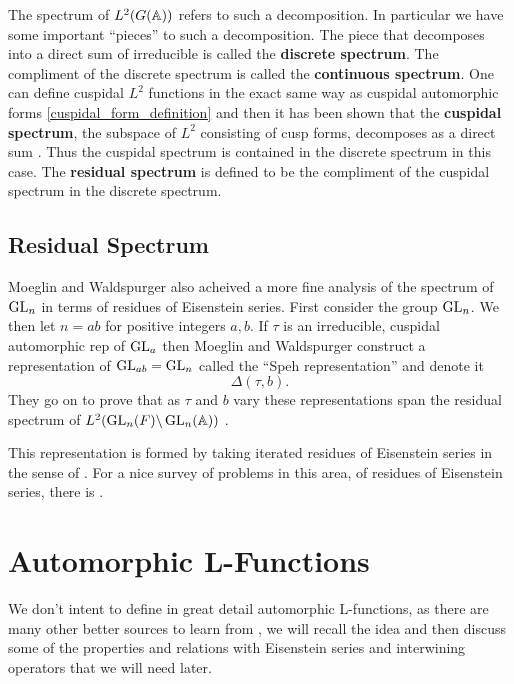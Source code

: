 The spectrum of \(L^2(G(\A))\) refers to such a decomposition. In particular we have some important ``pieces'' to such a decomposition. The piece that decomposes into a direct sum of irreducible is called the \textbf{discrete spectrum}. The compliment of the discrete spectrum is called the \textbf{continuous spectrum}. One can define cuspidal \(L^2\) functions in the exact same way as cuspidal automorphic forms \ref{cuspidal_form_definition} and then it has been shown that the \textbf{cuspidal spectrum}, the subspace of \(L^2\) consisting of cusp forms, decomposes as a direct sum \cite[9]{getzIntroductionAutomorphicRepresentations2024}. Thus the cuspidal spectrum is contained in the discrete spectrum in this case. The \textbf{residual spectrum} is defined to be the compliment of the cuspidal spectrum in the discrete spectrum.

\subsection{Residual Spectrum}\label{residual_spec}
Moeglin and Waldspurger also acheived a more fine analysis of the spectrum of \(\operatorname{GL}_n\) in terms of residues of Eisenstein series. 
First consider the group \(\operatorname{GL}_n\). We then let \(n = ab\) for positive integers \(a,b\). If \(\tau\) is an irreducible, cuspidal automorphic rep of \(\operatorname{GL}_a\) then Moeglin and Waldspurger construct a representation of \(\operatorname{GL}_{ab} = \operatorname{GL}_n\) called the ``Speh representation'' and denote it 
\[\Delta(\tau, b).\]
They go on to prove that as \(\tau\) and \(b\) vary these representations span the residual spectrum of \(L^2(\GL_n(F) \backslash \GL_n(\A))\) \cite[Thm. 1.1]{jiangPolesCertainResidual2013}.

This representation is formed by taking iterated residues of Eisenstein series in the sense of \cite[V]{moeglinSpectralDecompositionEisenstein1995}. For a nice survey of problems in this area, of residues of Eisenstein series, there is \cite{jiangResiduesEisensteinSeries2008a}.



\section{Automorphic L-Functions}
We don't intent to define in great detail automorphic L-functions, as there are many other better sources to learn from \cite[Part 2.III.2]{borelAutomorphicFormsRepresentations1979}\cite{shahidiEisensteinSeriesAutomorphic2010}\cite{cogdellLFUNCTIONSFUNCTORIALITY}\cite[9, 10, 11]{bumpIntroductionLanglandsProgram2004}\cite{arthurLfunctionsAutomorphicRepresenta}, we will recall the idea and then discuss some of the properties and relations with Eisenstein series and interwining operators that we will need later.

